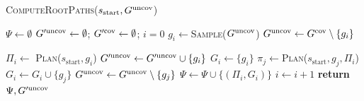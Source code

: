 \documentclass[a4paper]{report}
\begin{document}
\begin{algorithm}[t]
\caption{\textsc{ComputeRootPaths}($s_{\textrm{start}}, G^{\textrm{uncov}}$)}
\label{alg:step1}
    \AlgFontSize
\begin{algorithmic}[1]
\State $\Psi \leftarrow \emptyset$   
\State $G'^{\textrm{uncov}} \leftarrow \emptyset$; \hspace{3mm}
       $G'^{\textrm{cov}} \leftarrow \emptyset$; \hspace{3mm}
       $i = 0$
\While{$\Guncov \neq \emptyset$}
    \State $g_i \leftarrow$\textsc{Sample}($G^{\textrm{uncov}}$)
    \State $G^{\textrm{uncov}} \leftarrow G^{\textrm{cov}} \setminus \{g_i\}$
    
    \State $\Pi_i \leftarrow$ \textsc{Plan}($s_{\textrm{start}}, g_i$)
      
        \State $G'^{\textrm{uncov}} \leftarrow G'^{\textrm{uncov}} \cup \{g_i\}$
    \Else
        \State $G_i \leftarrow \{ g_i \}$
            \State $\pi_j \leftarrow$\textsc{Plan}($s_{\textrm{start}},g_j,\Pi_i$)
             
                \State $G_i \leftarrow G_i \cup \{g_j\}$
                \State $G^{\textrm{uncov}} \leftarrow G^{\textrm{uncov}} \setminus \{g_j\}$
            \EndIf
        \EndFor
        \State $\Psi \leftarrow \Psi \cup \{ (\Pi_i, G_i)\}$
        \State $i \leftarrow i + 1$
    \EndIf
\EndWhile
\State \textbf{return} $\Psi, G'^{\textrm{uncov}}$
\end{algorithmic}
\end{algorithm}
\end{document}
